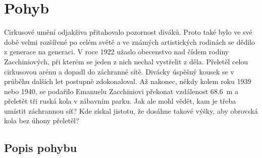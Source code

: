 \setchaptertoc
\chapter{Pohyb}\label{fyz:IchapVIII}
  Cirkusové umění odjakživa přitahovalo pozornost diváků. Proto také bylo ve své době velmi
  rozšířené po celém světě a ve známých artistických rodinách se dědilo z generace na generaci. V
  roce 1922 užaslo obecenstvo nad číslem rodiny Zacchiniových, při kterém se jeden z nich nechal
  vystřelit z děla. Přeletěl celou cirkusovou arénu a dopadl do záchranné sítě. Divácky úspěšný
  kousek se v průběhu dalších let postupně zdokonaloval. Až nakonec, někdy kolem roku 1939 nebo
  1940, se podařilo Emanuelu Zacchiniovi překonat vzdálenost \SI{68.6}{\metre} a přeletět tři ruská
  kola v zábavním parku. Jak ale mohl vědět, kam je třeba umístit záchrannou síť? Kde získal
  jistotu, že dosáhne takové výšky, aby obrovská kola bez úhony přeletěl?

  \section{Popis pohybu}\label{fyz:IchapVIIIsecI}
      
